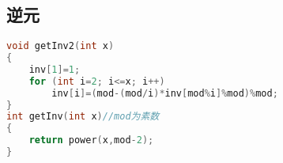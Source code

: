 \subsection{逆元}
	\begin{lstlisting}[language=c++]
void getInv2(int x)
{
	inv[1]=1;
	for (int i=2; i<=x; i++)
		inv[i]=(mod-(mod/i)*inv[mod%i]%mod)%mod;
}
int getInv(int x)//mod为素数
{
	return power(x,mod-2);
}
	\end{lstlisting}